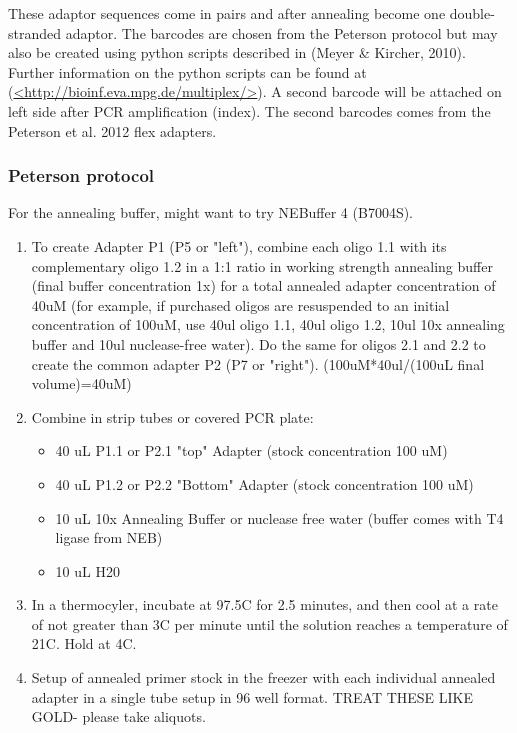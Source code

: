 \documentclass[11pt, oneside]{article}
\begin{document}
			\noindent These adaptor sequences come in pairs and after annealing become one double-stranded adaptor. The barcodes are chosen from the Peterson protocol but may also be created using python scripts described in (Meyer \& Kircher, 2010). Further information on the python scripts can be found at 				(\url{<http://bioinf.eva.mpg.de/multiplex/>}). A second barcode will be attached on left side after PCR amplification (index). The second barcodes comes from the Peterson et al. 2012 flex adapters.

	\subsubsection{Peterson protocol}
	For the annealing buffer, might want to try NEBuffer 4 (B7004S).
	\begin{enumerate}
		\item To create Adapter P1 (P5 or "left"), combine each oligo 1.1 with its complementary oligo 1.2 in a 1:1 ratio in working strength annealing buffer (final buffer concentration 1x) for a total annealed adapter concentration of 40uM (for example, if purchased oligos are resuspended to an initial concentration of 100uM, use 40ul oligo 1.1, 40ul oligo 1.2, 10ul 10x annealing buffer and 10ul nuclease-free water). Do the same for oligos 2.1 and 2.2 to create the common adapter P2 (P7 or "right"). (100uM*40ul/(100uL final volume)=40uM)
		\item Combine in strip tubes or covered PCR plate:
			\begin{itemize}
				\item 40 uL P1.1 or P2.1 "top" Adapter (stock concentration 100 uM) 
				\item 40 uL P1.2 or P2.2 "Bottom" Adapter (stock concentration 100 uM) 
				\item 10 uL 10x Annealing Buffer or nuclease free water (buffer comes with T4 ligase from NEB)
				\item 10 uL H20
			\end{itemize}
		\item In a thermocyler, incubate at 97.5C for 2.5 minutes, and then cool at a rate of not greater than 3C per minute until the solution reaches a temperature of 21C. Hold at 4C.
		\item Setup of annealed primer stock in the freezer with each individual annealed adapter in a single tube setup in 96 well format. TREAT THESE LIKE GOLD- please take aliquots.
		
		\end{enumerate}
\end{document}
